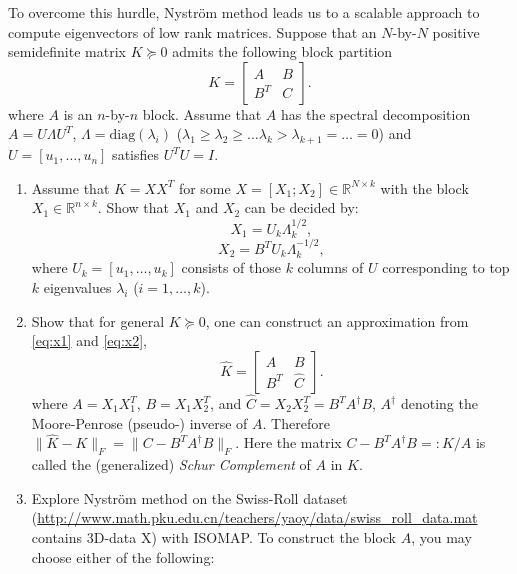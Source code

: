 \documentclass[11pt]{article}
\def\R{{\mathbb R}}
\def\diag{{\mathrm{diag}}}
\begin{document}
\begin{enumerate}
To overcome this hurdle, Nystr\"{o}m method leads us to a scalable approach to compute eigenvectors of low rank matrices.  
Suppose that an $N$-by-$N$ positive semidefinite matrix $K\succeq 0$ admits the following block partition
\begin{equation}
K = \left[
\begin{array}{cc}
A & B \\
B^T & C
\end{array}
\right].
\end{equation}
where $A$ is an $n$-by-$n$ block. Assume that $A$ has the spectral decomposition $A=U \Lambda U^T$, $\Lambda=\diag(\lambda_i)$ ($\lambda_1\geq \lambda_2 \geq \ldots \lambda_k > \lambda_{k+1}=\ldots=0$) and $U=[u_1,\ldots,u_n]$ satisfies $U^TU=I$. 
\begin{enumerate}
\item Assume that $K=X X^T$ for some $X=[X_1; X_2] \in \R^{N\times k}$ with the block $X_1\in \R^{n\times k}$. Show that $X_1$ and $X_2$ can be decided by:
\begin{equation}\label{eq:x1}
 X_1 = U_k \Lambda_k^{1/2}, 
\end{equation}
\begin{equation} \label{eq:x2}
X_2 = B^T U_k \Lambda_k^{-1/2}, 
\end{equation}
where $U_k=[u_1, \ldots, u_k]$ consists of those $k$ columns of $U$ corresponding to top $k$ eigenvalues $\lambda_i$ ($i=1,\ldots,k$).  
\item Show that for general $K\succeq 0$, one can construct an approximation from \eqref{eq:x1} and \eqref{eq:x2}, 
\begin{equation}
\hat{K} = \left[
\begin{array}{cc}
A & B \\
B^T & \hat{C} 
\end{array}
\right].
\end{equation}
where $A=X_1 X_1^T$, $B= X_1 X_2^T$, and $\hat{C}=X_2 X_2^T =   B^T A^\dagger B$, $A^\dagger$ denoting the Moore-Penrose (pseudo-) inverse of $A$. Therefore $\|\hat{K}-K\|_F =\|C- B^T A^\dagger B\|_F$. Here the matrix $C-B^T A^\dagger B=:K/A$ is called the (generalized) \emph{Schur Complement} of $A$ in $K$.
\item Explore Nystr\"{o}m method on the Swiss-Roll dataset (\url{http://www.math.pku.edu.cn/teachers/yaoy/data/swiss_roll_data.mat} contains 3D-data X) with ISOMAP. To construct the block $A$, you may choose either of the following: 

\end{enumerate}
\end{enumerate}
\end{document}
